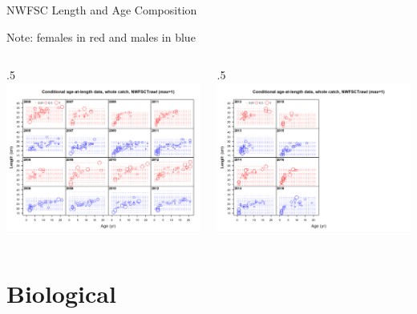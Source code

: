 \documentclass[ignorenonframetext,]{beamer}
\def\begincols{\begin{columns}}
\def\begincol{\begin{column}}
\def\endcol{\end{column}}
\def\endcols{\end{columns}}
\begin{document}
\begin{frame}{NWFSC Length and Age Composition}

Note: females in red and males in blue \begincols
 \begincol{.5\textwidth}
\includegraphics[height=.5\textheight]{r4ss/plots_mod1/comp_condAALdat_bubflt8mkt0_page1.png}
\endcol
 \begincol{.5\textwidth}
\includegraphics[height=.5\textheight]{r4ss/plots_mod1/comp_condAALdat_bubflt8mkt0_page2.png}
\endcol
\endcols

\end{frame}

\section{Biological}\label{biological}
\end{document}
